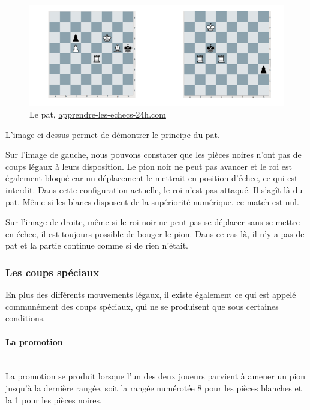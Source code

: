 \documentclass{article}
\begin{document}
\begin{figure}[h]
\centering
\includegraphics[scale=1]{img/pat.png}
\caption{Le pat,  \href{https://www.apprendre-les-echecs-24h.com/blog/debuter-aux-echecs/le-pat/}{ apprendre-les-echecs-24h.com}}
\end{figure}

L'image ci-dessus permet de démontrer le principe du pat.

Sur l'image de gauche, nous pouvons constater que les pièces noires n'ont pas de coups légaux à leurs disposition. Le pion noir ne peut pas avancer et le roi est également bloqué car un déplacement le mettrait en position d'échec, ce qui est interdit. Dans cette configuration actuelle, le roi n'est pas attaqué. Il s'agît là du pat. Même si les blancs disposent de la supériorité numérique, ce match est nul.

Sur l'image de droite, même si le roi noir ne peut pas se déplacer sans se mettre en échec, il est toujours possible de bouger le pion. Dans ce cas-là, il n'y a pas de pat et la partie continue comme si de rien n'était.

\subsubsection{Les coups spéciaux}

En plus des différents mouvements légaux, il existe également ce qui est appelé communément des coups spéciaux, qui ne se produisent que sous certaines conditions.

\paragraph{La promotion}\label{Promotion}
~~\\

La promotion se produit lorsque l'un des deux joueurs parvient à amener un pion jusqu'à la dernière rangée, soit la rangée numérotée 8 pour les pièces blanches et la 1 pour les pièces noires.
\end{document}
